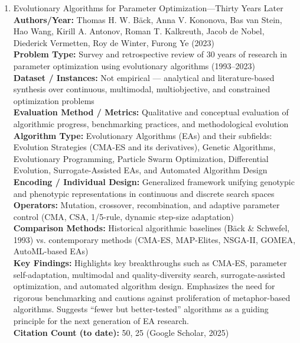 \documentclass[a4paper,12pt]{article}
\begin{document}
\begin{enumerate}[leftmargin=2em, labelwidth=1em, labelsep=0.5em, itemsep=1ex]
  \item Evolutionary Algorithms for Parameter Optimization—Thirty Years Later \\
    \textbf{Authors/Year:} Thomas H. W. Bäck, Anna V. Kononova, Bas van Stein, Hao Wang, Kirill A. Antonov, Roman T. Kalkreuth, Jacob de Nobel, Diederick Vermetten, Roy de Winter, Furong Ye (2023) \\  
    \textbf{Problem Type:} Survey and retrospective review of 30 years of research in parameter optimization using evolutionary algorithms (1993–2023) \\  
    \textbf{Dataset / Instances:} Not empirical — analytical and literature-based synthesis over continuous, multimodal, multiobjective, and constrained optimization problems \\  
    \textbf{Evaluation Method / Metrics:} Qualitative and conceptual evaluation of algorithmic progress, benchmarking practices, and methodological evolution \\  
    \textbf{Algorithm Type:} Evolutionary Algorithms (EAs) and their subfields: Evolution Strategies (CMA-ES and its derivatives), Genetic Algorithms, Evolutionary Programming, Particle Swarm Optimization, Differential Evolution, Surrogate-Assisted EAs, and Automated Algorithm Design \\  
    \textbf{Encoding / Individual Design:} Generalized framework unifying genotypic and phenotypic representations in continuous and discrete search spaces \\  
    \textbf{Operators:} Mutation, crossover, recombination, and adaptive parameter control (CMA, CSA, 1/5-rule, dynamic step-size adaptation) \\  
    \textbf{Comparison Methods:} Historical algorithmic baselines (Bäck \& Schwefel, 1993) vs. contemporary methods (CMA-ES, MAP-Elites, NSGA-II, GOMEA, AutoML-based EAs) \\  
    \textbf{Key Findings:} Highlights key breakthroughs such as CMA-ES, parameter self-adaptation, multimodal and quality-diversity search, surrogate-assisted optimization, and automated algorithm design. Emphasizes the need for rigorous benchmarking and cautions against proliferation of metaphor-based algorithms. Suggests “fewer but better-tested” algorithms as a guiding principle for the next generation of EA research. \\  
    \textbf{Citation Count (to date):} 50, 25 (Google Scholar, 2025) \\[2ex]
  

\end{enumerate}
\end{document}
